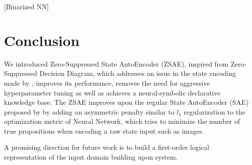 [Binarized NN]


\section{Conclusion}
\label{conclusion}

We introduced Zero-Suppressed State AutoEncoder (ZSAE), inspired from
Zero-Suppressed Decision Diagram, which addresses an issue in the state
encoding made by \latentplanner, improves its performance, removes the need
for aggressive hyperparameter tuning as well as achieves a
neural-symbolic declarative knowledge base.  The ZSAE improves upon the
regular State AutoEncoder (SAE) proposed by \citeauthor{Asai2018} by
adding an asymmetric penalty similar to $l_1$ regularization to the optimization metric of
Neural Network, which tries to minimize the number of true propositions
when encoding a raw state input such as images.

A promising direction for future work is to build a first-order logical
representation of the input domain building upon \latentplanner system.

